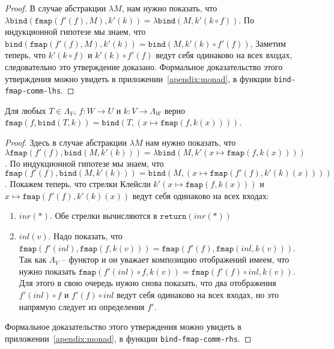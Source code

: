 \begin{proof}
  В случае абстракции $\lambda M$, нам нужно показать, что $\lambda \texttt{bind}(\texttt{fmap}(f'(f), M), k'(k)) = \lambda \texttt{bind}(M, k'(k \circ f))$. По индукционной гипотезе мы знаем, что $\texttt{bind}(\texttt{fmap}(f'(f), M), k'(k)) = \texttt{bind}(M, k'(k) \circ f'(f))$, Заметим теперь, что $k'(k \circ f)$ и $k'(k) \circ f'(f)$ ведут себя одинаково на всех входах, следовательно это утверждение доказано. Формальное доказательство этого утверждения можно увидеть в приложении~\ref{apendix:monad}, в функции \texttt{bind-fmap-comm-lhs}.
\end{proof}

\begin{lemma}
  \label{monad:bind-fmap-comm-rhs}
  Для любых $T \in \Lambda_{V}$, $f : W \to U$ и $k : V \to \Lambda_{W}$ верно $ \texttt{fmap}(f, \texttt{bind}(T, k)) = \texttt{bind}(T, (x \mapsto \texttt{fmap}(f, k(x))))$.
\end{lemma}

\begin{proof}
  Здесь в случае абстракции $\lambda M$ нам нужно показать, что $\lambda \texttt{fmap}(f'(f), \texttt{bind}(M, k'(k))) = \lambda \texttt{bind}(M, k'(x \mapsto \texttt{fmap}(f, k(x))))$. По индукционной гипотезе мы знаем, что $\texttt{fmap}(f'(f), \texttt{bind}(M, k'(k))) = \texttt{bind}(M, (x \mapsto \texttt{fmap}(f'(f), k'(k)(x))))$. Покажем теперь, что стрелки Клейсли $ k'(x \mapsto \texttt{fmap}(f, k(x))) $ и $ x \mapsto \texttt{fmap}(f'(f), k'(k)(x)) $ ведут себя одинаково на всех входах:

  \begin{enumerate}
    \item $inr(*)$. Обе стрелки вычисляются в $\texttt{return}(inr(*))$
    \item $inl(v)$. Надо показать, что $\texttt{fmap}(f'(inl), \texttt{fmap}(f, k(v))) = \texttt{fmap}(f'(f), \texttt{fmap}(inl, k(v)))$. Так как $\Lambda_{V}$ -- функтор и он уважает композицию отображений имеем, что нужно показать $\texttt{fmap}(f'(inl) \circ f, k(v)) = \texttt{fmap}(f'(f) \circ inl, k(v))$. Для этого в свою очередь нужно снова показать, что два отображения $f'(inl) \circ f$ и $f'(f) \circ inl$ ведут себя одинаково на всех входах, но это напрямую следует из определения $f'$.
  \end{enumerate}

  Формальное доказательство этого утверждения можно увидеть в приложении~\ref{apendix:monad}, в функции \texttt{bind-fmap-comm-rhs}.
\end{proof}

